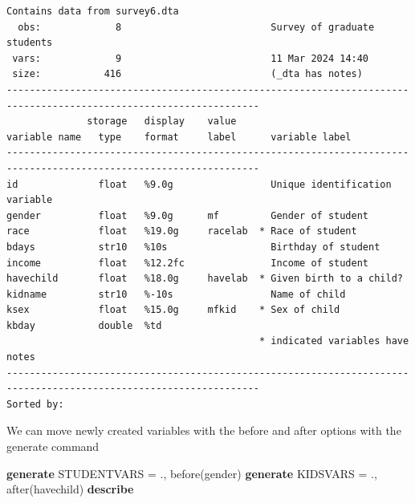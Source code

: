 \documentclass[
]{book}
\newenvironment{Shaded}{\begin{snugshade}}{\end{snugshade}}
\newcommand{\KeywordTok}[1]{\textcolor[rgb]{0.13,0.29,0.53}{\textbf{#1}}}
\newcommand{\NormalTok}[1]{#1}
\begin{document}
\begin{verbatim}
Contains data from survey6.dta
  obs:             8                          Survey of graduate students
 vars:             9                          11 Mar 2024 14:40
 size:           416                          (_dta has notes)
------------------------------------------------------------------------------------------------------------------
              storage   display    value
variable name   type    format     label      variable label
------------------------------------------------------------------------------------------------------------------
id              float   %9.0g                 Unique identification variable
gender          float   %9.0g      mf         Gender of student
race            float   %19.0g     racelab  * Race of student
bdays           str10   %10s                  Birthday of student
income          float   %12.2fc               Income of student
havechild       float   %18.0g     havelab  * Given birth to a child?
kidname         str10   %-10s                 Name of child
ksex            float   %15.0g     mfkid    * Sex of child
kbday           double  %td                   
                                            * indicated variables have notes
------------------------------------------------------------------------------------------------------------------
Sorted by: 
\end{verbatim}

We can move newly created variables with the before and after options with the generate command

\begin{Shaded}
\begin{Highlighting}[]
\KeywordTok{generate}\NormalTok{ STUDENTVARS = ., before(gender)}
\KeywordTok{generate}\NormalTok{ KIDSVARS = ., after(havechild)}
\KeywordTok{describe}
\end{Highlighting}
\end{Shaded}
\end{document}

